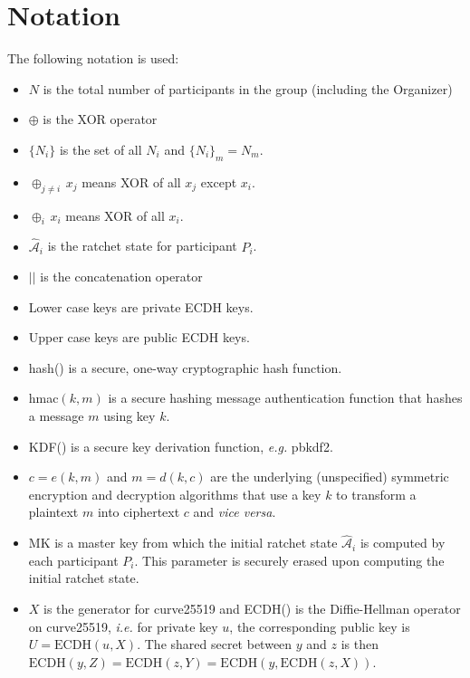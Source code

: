 \documentclass[%
preprint,
amsmath,amssymb,
aps,
prb,
floatfix,
]{revtex4-1}
\begin{document}
\section{\label{sec:notation}Notation}
The following notation is used:
\begin{itemize}
\item $N$ is the total number of participants in the group (including the
Organizer)
\item $\oplus$ is the XOR operator
\item $\{N_i\}$ is the set of all $N_i$ and $\{N_i\}_m = N_m$.
\item $\oplus_{j \ne i} \, x_j$ means XOR of all $x_j$ except $x_i$.
\item  $\oplus_i \, x_i$ means XOR of all $x_i$.
\item $\mathcal{\hat{A}}_i$ is the ratchet state for
participant $P_i$.
\item $||$ is the concatenation operator
\item Lower case keys are private ECDH keys.
\item Upper case keys are public ECDH keys.
\item hash() is a secure, one-way cryptographic hash function.
\item hmac$(k,m)$ is a secure hashing message authentication function that
hashes a message $m$ using key $k$.
\item KDF() is a secure key derivation function, \textit{e.g.} pbkdf2.
\item $c = e(k, m)$ and $m = d(k,c)$ are the underlying (unspecified) symmetric
encryption and decryption algorithms that use a key $k$ to transform a plaintext
$m$ into ciphertext $c$ and \textit{vice versa}.
\item MK is a master key from which the initial ratchet state
$\mathcal{\hat{A}}_i$ is computed by each participant $P_i$. This parameter is
securely erased upon computing the initial ratchet state.
\item $X$ is the generator for curve25519 and ECDH() is the Diffie-Hellman
operator on curve25519, \textit{i.e.} for private key $u$, the
corresponding public key is $U = \mathrm{ECDH}(u, X)$. The shared secret between
$y$ and $z$ is then $ \mathrm{ECDH}(y,Z) = \mathrm{ECDH}(z,Y) =
\mathrm{ECDH}(y,\mathrm{ECDH}(z, X))$.
\end{itemize}
\end{document}
